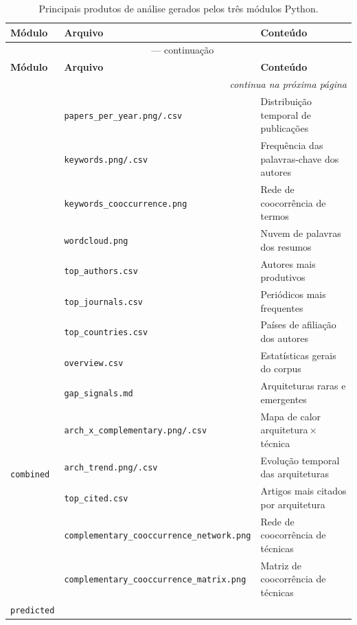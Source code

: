 \begin{longtable}{llp{6.5cm}}
\caption{Principais produtos de análise gerados pelos três módulos
         Python.}
\label{tab:outputs} \\
\toprule
\textbf{Módulo} & \textbf{Arquivo} & \textbf{Conteúdo} \\
\midrule
\endfirsthead
\multicolumn{3}{c}{\tablename~\thetable{} — continuação} \\
\toprule
\textbf{Módulo} & \textbf{Arquivo} & \textbf{Conteúdo} \\
\midrule
\endhead
\midrule
\multicolumn{3}{r}{\textit{continua na próxima página}} \\
\endfoot
\bottomrule
\endlastfoot
\multirow{7}{*}{\texttt{bibliometric}}
 & \texttt{papers\_per\_year.png/.csv}     & Distribuição temporal de publicações \\
 & \texttt{keywords.png/.csv}              & Frequência das palavras-chave dos autores \\
 & \texttt{keywords\_cooccurrence.png}     & Rede de coocorrência de termos \\
 & \texttt{wordcloud.png}                  & Nuvem de palavras dos resumos \\
 & \texttt{top\_authors.csv}               & Autores mais produtivos \\
 & \texttt{top\_journals.csv}              & Periódicos mais frequentes \\
 & \texttt{top\_countries.csv}             & Países de afiliação dos autores \\
\midrule
\multirow{7}{*}{\texttt{combined}}
 & \texttt{overview.csv}                   & Estatísticas gerais do corpus \\
 & \texttt{gap\_signals.md}                & Arquiteturas raras e emergentes \\
 & \texttt{arch\_x\_complementary.png/.csv}& Mapa de calor arquitetura\,$\times$\,técnica \\
 & \texttt{arch\_trend.png/.csv}           & Evolução temporal das arquiteturas \\
 & \texttt{top\_cited.csv}                 & Artigos mais citados por arquitetura \\
 & \texttt{complementary\_cooccurrence\_network.png} & Rede de coocorrência de técnicas \\
 & \texttt{complementary\_cooccurrence\_matrix.png}  & Matriz de coocorrência de técnicas \\
\midrule
\multirow{8}{*}{\texttt{predicted}}

\end{longtable}
